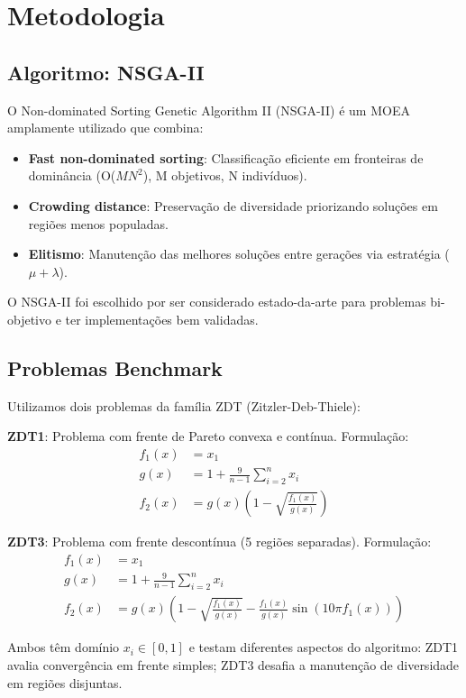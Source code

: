 \section{Metodologia}

\subsection{Algoritmo: NSGA-II}
O Non-dominated Sorting Genetic Algorithm II (NSGA-II) é um MOEA amplamente utilizado que combina:
\begin{itemize}
  \item \textbf{Fast non-dominated sorting}: Classificação eficiente em fronteiras de dominância (O($MN^2$), M objetivos, N indivíduos).
  \item \textbf{Crowding distance}: Preservação de diversidade priorizando soluções em regiões menos populadas.
  \item \textbf{Elitismo}: Manutenção das melhores soluções entre gerações via estratégia ($\mu + \lambda$).
\end{itemize}

O NSGA-II foi escolhido por ser considerado estado-da-arte para problemas bi-objetivo e ter implementações bem validadas.

\subsection{Problemas Benchmark}
Utilizamos dois problemas da família ZDT (Zitzler-Deb-Thiele):

\textbf{ZDT1}: Problema com frente de Pareto convexa e contínua. Formulação:
\begin{align*}
f_1(x) &= x_1 \\
g(x) &= 1 + \frac{9}{n-1} \sum_{i=2}^{n} x_i \\
f_2(x) &= g(x) \left(1 - \sqrt{\frac{f_1(x)}{g(x)}}\right)
\end{align*}

\textbf{ZDT3}: Problema com frente descontínua (5 regiões separadas). Formulação:
\begin{align*}
f_1(x) &= x_1 \\
g(x) &= 1 + \frac{9}{n-1} \sum_{i=2}^{n} x_i \\
f_2(x) &= g(x) \left(1 - \sqrt{\frac{f_1(x)}{g(x)}} - \frac{f_1(x)}{g(x)}\sin(10\pi f_1(x))\right)
\end{align*}

Ambos têm domínio $x_i \in [0,1]$ e testam diferentes aspectos do algoritmo: ZDT1 avalia convergência em frente simples; ZDT3 desafia a manutenção de diversidade em regiões disjuntas.

